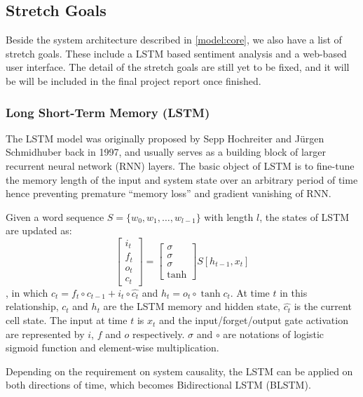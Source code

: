 \documentclass[conference]{IEEEtran}
\begin{document}
\subsection{Stretch Goals}
\label{model:stretch}
    
    Beside the system architecture described in \autoref{model:core}, we also have a
    list of stretch goals. These include a LSTM based sentiment analysis and a 
    web-based user interface. The detail of the stretch
    goals are still yet to be fixed, and it will be will be included in the final project
    report once finished. 

\subsubsection{Long Short-Term Memory (LSTM)}
\label{model:stretch:lstm}
    The LSTM model was originally proposed by Sepp Hochreiter and J\"urgen Schmidhuber back in 
    1997\cite{hochreiter1997long}, and usually serves as a building block of larger
    recurrent neural network (RNN) layers. The basic object of LSTM is to fine-tune
    the memory length of the input and system state over an arbitrary period of time
    hence preventing premature ``memory loss'' and gradient vanishing of RNN.
    
    Given a word sequence $S=\{w_0,w_1,\ldots,w_{l-1}\}$ with length $l$, the states
    of LSTM are updated as:
    $$
    \begin{bmatrix} 
    i_t\\f_t\\o_t\\c_t 
    \end{bmatrix} = 
    \begin{bmatrix}
    \sigma\\\sigma\\\sigma\\\tanh
    \end{bmatrix}
    S[h_{t-1},x_t]
    $$
    , in which $c_t=f_t\circ c_{t-1} + i_t\circ\hat{c_t}$ and $h_t=o_t\circ\tanh{c_t}$.
    At time $t$ in this relationship, $c_t$ and $h_t$ are the LSTM memory and 
    hidden state, $\hat{c_t}$ is the current cell state. The input at time $t$ 
    is $x_t$ and the input/forget/output gate activation are represented by $i$, 
    $f$ and $o$ respectively. $\sigma$ and $\circ$ are notations of logistic 
    sigmoid function and element-wise multiplication\cite{zhou2016text}.
    
    Depending on the requirement on system causality, the LSTM can be applied on
    both directions of time, which becomes Bidirectional LSTM 
    (BLSTM)\cite{schuster1997bidirectional,barnes2017assessing}.
\end{document}
